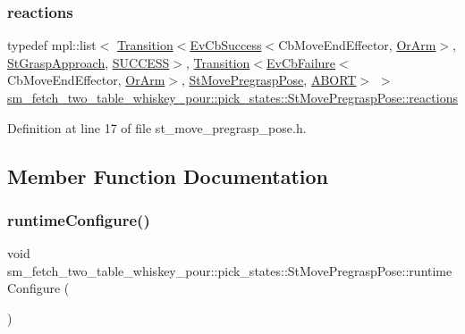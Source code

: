 \subsubsection{\texorpdfstring{reactions}{reactions}}
{\footnotesize\ttfamily typedef mpl\+::list$<$ \hyperlink{classsmacc_1_1Transition}{Transition}$<$\hyperlink{structsmacc_1_1EvCbSuccess}{Ev\+Cb\+Success}$<$Cb\+Move\+End\+Effector, \hyperlink{classsm__fetch__two__table__whiskey__pour_1_1OrArm}{Or\+Arm}$>$, \hyperlink{structsm__fetch__two__table__whiskey__pour_1_1pick__states_1_1StGraspApproach}{St\+Grasp\+Approach}, \hyperlink{structsmacc_1_1default__transition__tags_1_1SUCCESS}{S\+U\+C\+C\+E\+SS}$>$, \hyperlink{classsmacc_1_1Transition}{Transition}$<$\hyperlink{structsmacc_1_1EvCbFailure}{Ev\+Cb\+Failure}$<$Cb\+Move\+End\+Effector, \hyperlink{classsm__fetch__two__table__whiskey__pour_1_1OrArm}{Or\+Arm}$>$, \hyperlink{structsm__fetch__two__table__whiskey__pour_1_1pick__states_1_1StMovePregraspPose}{St\+Move\+Pregrasp\+Pose}, \hyperlink{structsmacc_1_1default__transition__tags_1_1ABORT}{A\+B\+O\+RT}$>$ $>$ \hyperlink{structsm__fetch__two__table__whiskey__pour_1_1pick__states_1_1StMovePregraspPose_af0c044fc59209e26f14b1df63b0d5412}{sm\+\_\+fetch\+\_\+two\+\_\+table\+\_\+whiskey\+\_\+pour\+::pick\+\_\+states\+::\+St\+Move\+Pregrasp\+Pose\+::reactions}}



Definition at line 17 of file st\+\_\+move\+\_\+pregrasp\+\_\+pose.\+h.



\subsection{Member Function Documentation}
\mbox{\label{structsm__fetch__two__table__whiskey__pour_1_1pick__states_1_1StMovePregraspPose_a9295013d22a3052dc8f17686f9b63aa6}} 
\subsubsection{\texorpdfstring{runtime\+Configure()}{runtimeConfigure()}}
{\footnotesize\ttfamily void sm\+\_\+fetch\+\_\+two\+\_\+table\+\_\+whiskey\+\_\+pour\+::pick\+\_\+states\+::\+St\+Move\+Pregrasp\+Pose\+::runtime\+Configure (\begin{DoxyParamCaption}{ }\end{DoxyParamCaption})\hspace{0.3cm}{\ttfamily [inline]}}



